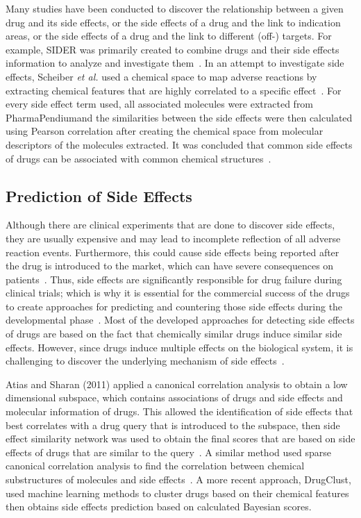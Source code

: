 Many studies have been conducted to discover the relationship between a given drug and its side effects, or the side effects of a drug and the link to indication areas, or the side effects of a drug and the link to different (off-) targets.
For example, \ac{SIDER} was primarily created to combine drugs and their side effects information to analyze and investigate them~\cite{kuhn_side_2010}.
In an attempt to investigate side effects, Scheiber \textit{et al.} used a chemical space to map adverse reactions by extracting chemical features that are highly correlated to a specific effect~\cite{scheiber_mapping_2009}.
For every side effect term used, all associated molecules were extracted from PharmaPendium\footnotemark and the similarities between the side effects were then calculated using Pearson correlation after creating the chemical space from molecular descriptors of the molecules extracted.
It was concluded that common side effects of drugs can be associated with common chemical structures~\cite{scheiber_mapping_2009}.

\subsection{Prediction of Side Effects}

Although there are clinical experiments that are done to discover side effects, they are usually expensive and may lead to incomplete reflection of all adverse reaction events.
Furthermore, this could cause side effects being reported after the drug is introduced to the market, which can have severe consequences on patients~\cite{dimitri_drugclust:_2017}.
Thus, side effects are significantly responsible for drug failure during clinical trials; which is why it is essential for the commercial success of the drugs to create approaches for predicting and countering those side effects during the developmental phase~\cite{mizutani_relating_2012}.
Most of the developed approaches for detecting side effects of drugs are based on the fact that chemically similar drugs induce similar side effects.
However, since drugs induce multiple effects on the biological system, it is challenging to discover the underlying mechanism of side effects~\cite{dimitri_drugclust:_2017}.

Atias and Sharan (2011) applied a canonical correlation analysis to obtain a low dimensional subspace, which contains associations of drugs and side effects and molecular information of drugs.
This allowed the identification of side effects that best correlates with a drug query that is introduced to the subspace, then side effect similarity network was used to obtain the final scores that are based on side effects of drugs that are similar to the query~\cite{atias_algorithmic_2011}.
A similar method used sparse canonical correlation analysis to find the correlation between chemical substructures of molecules and side effects~\cite{pauwels_predicting_2011}.
A more recent approach, DrugClust, used machine learning methods to cluster drugs based on their chemical features then obtains side effects prediction based on calculated Bayesian scores\cite{dimitri_drugclust:_2017}.

